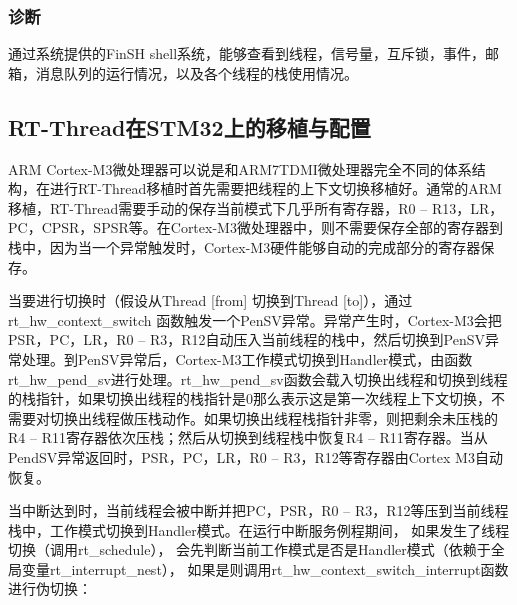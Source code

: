 \subsubsection{诊断}
通{\cf}过系{\cf}统提{\cf}供的{\cf}Fi{\cf}nS{\cf}H {\cf}sh{\cf}el{\cf}l系{\cf}统，{\cf}能够{\cf}查看{\cf}到线{\cf}程，{\cf}信号{\cf}量，{\cf}互斥{\cf}锁，{\cf}事件{\cf}，邮{\cf}箱，{\cf}消息{\cf}队列{\cf}的运{\cf}行情{\cf}况，{\cf}以及{\cf}各个{\cf}线程{\cf}的栈{\cf}使用{\cf}情况。

\subsection{RT-Thread在STM32上的移植与配置}
ARM{\reg} Cortex{\reg}-M3微{\cf}处理{\cf}器可{\cf}以说{\cf}是和{\cf}AR{\cf}M7{\cf}TD{\cf}MI{\cf}微处{\cf}理器{\cf}完全{\cf}不同{\cf}的体{\cf}系结{\cf}构，{\cf}在进{\cf}行R{\cf}T-{\cf}Th{\cf}re{\cf}ad{\cf}移植{\cf}时首{\cf}先需{\cf}要把{\cf}线程{\cf}的上{\cf}下文{\cf}切换{\cf}移植好。通常的ARM移植，RT-Thread需要手动的保存当前模式下几乎所有寄存器，R0 – R13，LR，PC，CPSR，SPSR等。在Cortex{\reg}-M3微处理器中，则不需要保存全部的寄存器到栈中，因为当一个异常触发时，Cortex{\reg}-M3硬件能够自动的完成部分的寄存器保存。

当要进行切换时（假设从Thread [from] 切换到Thread [to]），通过 rt{\_}hw{\_}context{\_}switch 函数触发一个PenSV异常。异常产生时，Cortex{\reg}-M3会把PSR，PC，LR，R0 – R3，R12自动压入当前线程的栈中，然后切换到PenSV异常处理。到PenSV异常后，Cortex{\reg}-M3工作模式切换到Handler模式，由函数rt{\_}hw{\_}pend{\_}sv进行处理。rt{\_}hw{\_}pend{\_}sv函{\cf}数会{\cf}载入{\cf}切换{\cf}出线{\cf}程和{\cf}切换{\cf}到线{\cf}程的{\cf}栈指{\cf}针，{\cf}如果{\cf}切换{\cf}出线{\cf}程的{\cf}栈指{\cf}针是{\cf}0那{\cf}么表{\cf}示这{\cf}是第{\cf}一次{\cf}线程{\cf}上下{\cf}文切{\cf}换，{\cf}不需{\cf}要对{\cf}切换{\cf}出线{\cf}程做{\cf}压栈{\cf}动作{\cf}。如{\cf}果切{\cf}换出{\cf}线程{\cf}栈指{\cf}针非{\cf}零，{\cf}则把{\cf}剩余{\cf}未压{\cf}栈的{\cf}R4{\cf} –{\cf} R{\cf}11{\cf}寄存{\cf}器依{\cf}次压{\cf}栈；{\cf}然后{\cf}从切{\cf}换到{\cf}线程{\cf}栈中{\cf}恢复{\cf}R4{\cf} –{\cf} R{\cf}11{\cf}寄存{\cf}器。{\cf}当从{\cf}Pe{\cf}nd{\cf}SV{\cf}异常{\cf}返回{\cf}时，{\cf}PS{\cf}R，{\cf}PC{\cf}，L{\cf}R，{\cf}R0{\cf} –{\cf} R{\cf}3，{\cf}R1{\cf}2等{\cf}寄存{\cf}器由Cortex{\reg} M3自动恢复。

当{\cf}中断{\cf}达到{\cf}时，{\cf}当前{\cf}线程{\cf}会被{\cf}中断{\cf}并把{\cf}PC{\cf}，P{\cf}SR{\cf}，R{\cf}0 {\cf}– {\cf}R3{\cf}，R{\cf}12{\cf}等压{\cf}到当{\cf}前线{\cf}程栈{\cf}中，{\cf}工作{\cf}模式{\cf}切换{\cf}到H{\cf}an{\cf}dl{\cf}er{\cf}模式{\cf}。在{\cf}运行{\cf}中断{\cf}服务{\cf}例程{\cf}期间{\cf}， {\cf}如果{\cf}发生{\cf}了线{\cf}程切换（调用rt{\_}schedule）， 会先{\cf}判断{\cf}当前{\cf}工作{\cf}模式{\cf}是否{\cf}是H{\cf}an{\cf}dl{\cf}er{\cf}模式{\cf}（依{\cf}赖于{\cf}全局{\cf}变量rt{\_}interrupt{\_}nest）， 如{\cf}果是{\cf}则调{\cf}用rt{\_}hw{\_}context{\_}switch{\_}interrupt函数进行伪切换：

